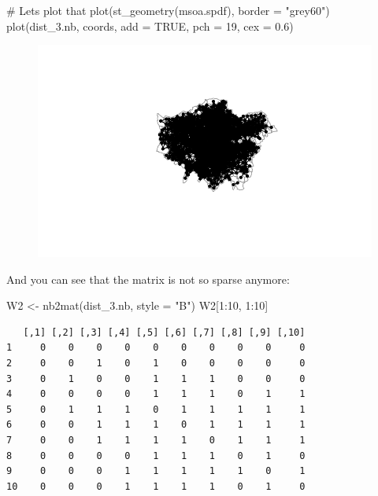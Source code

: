 \documentclass[
  letterpaper,
]{scrbook}
\newenvironment{Shaded}{\begin{snugshade}}{\end{snugshade}}
\newcommand{\AttributeTok}[1]{\textcolor[rgb]{0.40,0.45,0.13}{#1}}
\newcommand{\CommentTok}[1]{\textcolor[rgb]{0.37,0.37,0.37}{#1}}
\newcommand{\ConstantTok}[1]{\textcolor[rgb]{0.56,0.35,0.01}{#1}}
\newcommand{\DecValTok}[1]{\textcolor[rgb]{0.68,0.00,0.00}{#1}}
\newcommand{\FloatTok}[1]{\textcolor[rgb]{0.68,0.00,0.00}{#1}}
\newcommand{\FunctionTok}[1]{\textcolor[rgb]{0.28,0.35,0.67}{#1}}
\newcommand{\NormalTok}[1]{\textcolor[rgb]{0.00,0.23,0.31}{#1}}
\newcommand{\OtherTok}[1]{\textcolor[rgb]{0.00,0.23,0.31}{#1}}
\newcommand{\SpecialCharTok}[1]{\textcolor[rgb]{0.37,0.37,0.37}{#1}}
\newcommand{\StringTok}[1]{\textcolor[rgb]{0.13,0.47,0.30}{#1}}
\begin{document}
\begin{Shaded}
\begin{Highlighting}[]
\CommentTok{\# Lets plot that}
\FunctionTok{plot}\NormalTok{(}\FunctionTok{st\_geometry}\NormalTok{(msoa.spdf), }\AttributeTok{border =} \StringTok{"grey60"}\NormalTok{)}
\FunctionTok{plot}\NormalTok{(dist\_3.nb, coords, }
     \AttributeTok{add =} \ConstantTok{TRUE}\NormalTok{, }\AttributeTok{pch =} \DecValTok{19}\NormalTok{, }\AttributeTok{cex =} \FloatTok{0.6}\NormalTok{)}
\end{Highlighting}
\end{Shaded}

\begin{figure}[H]

{\centering \includegraphics{03_weights_files/figure-pdf/unnamed-chunk-7-1.pdf}

}

\end{figure}

And you can see that the matrix is not so sparse anymore:

\begin{Shaded}
\begin{Highlighting}[]
\NormalTok{W2 }\OtherTok{\textless{}{-}} \FunctionTok{nb2mat}\NormalTok{(dist\_3.nb, }\AttributeTok{style =} \StringTok{"B"}\NormalTok{)}
\NormalTok{W2[}\DecValTok{1}\SpecialCharTok{:}\DecValTok{10}\NormalTok{, }\DecValTok{1}\SpecialCharTok{:}\DecValTok{10}\NormalTok{]}
\end{Highlighting}
\end{Shaded}

\begin{verbatim}
   [,1] [,2] [,3] [,4] [,5] [,6] [,7] [,8] [,9] [,10]
1     0    0    0    0    0    0    0    0    0     0
2     0    0    1    0    1    0    0    0    0     0
3     0    1    0    0    1    1    1    0    0     0
4     0    0    0    0    1    1    1    0    1     1
5     0    1    1    1    0    1    1    1    1     1
6     0    0    1    1    1    0    1    1    1     1
7     0    0    1    1    1    1    0    1    1     1
8     0    0    0    0    1    1    1    0    1     0
9     0    0    0    1    1    1    1    1    0     1
10    0    0    0    1    1    1    1    0    1     0
\end{verbatim}
\end{document}
